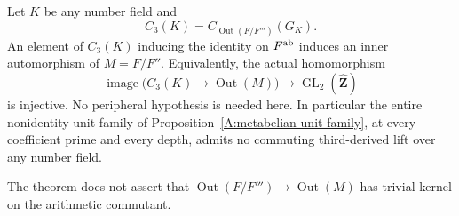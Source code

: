 \begin{theorem}
\label{A:third-derived-IA}
Let $K$ be any number field and
\[
 C_3(K)=C_{\operatorname{Out}(F/F''')}(G_K).
\]
An element of $C_3(K)$ inducing the identity on
$F^{\rm ab}$ induces an inner automorphism of $M=F/F''$.
Equivalently, the actual homomorphism
\[
 \operatorname{image}\bigl(C_3(K)\longrightarrow
                      \operatorname{Out}(M)\bigr)
       \longrightarrow\operatorname{GL}_2(\widehat{\mathbf Z})
                                                               \tag{A25}
\]
is injective. No peripheral hypothesis is needed here.
In particular the entire nonidentity unit family of
Proposition~\ref{A:metabelian-unit-family}, at every
coefficient prime and every depth, admits no commuting
third-derived lift over any number field.

The theorem does not assert that
$\operatorname{Out}(F/F''')\to\operatorname{Out}(M)$
has trivial kernel on the arithmetic commutant.
\end{theorem}

